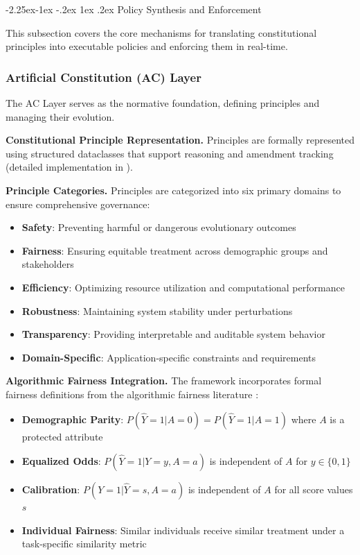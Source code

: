 \documentclass[manuscript,screen,review,anonymous,9pt]{acmart}
\makeatletter
\renewcommand\subsection{\@startsection{subsection}{2}{\z@}%
  {-2.25ex\@plus -1ex \@minus -.2ex}%
  {1ex \@plus .2ex}%
  {\normalfont\large\bfseries}}
\makeatother
\begin{document}
\subsection{Policy Synthesis and Enforcement}
\label{subsec:policy_synthesis_enforcement}

This subsection covers the core mechanisms for translating constitutional principles into executable policies and enforcing them in real-time.

\subsubsection{Artificial Constitution (AC) Layer}
The AC Layer serves as the normative foundation, defining principles and managing their evolution.

\textbf{Constitutional Principle Representation.} Principles are formally represented using structured dataclasses that support reasoning and amendment tracking (detailed implementation in ).

\textbf{Principle Categories.} Principles are categorized into six primary domains to ensure comprehensive governance:

\begin{itemize}
    \item \textbf{Safety}: Preventing harmful or dangerous evolutionary outcomes
    \item \textbf{Fairness}: Ensuring equitable treatment across demographic groups and stakeholders
    \item \textbf{Efficiency}: Optimizing resource utilization and computational performance
    \item \textbf{Robustness}: Maintaining system stability under perturbations
    \item \textbf{Transparency}: Providing interpretable and auditable system behavior
    \item \textbf{Domain-Specific}: Application-specific constraints and requirements
\end{itemize}

\textbf{Algorithmic Fairness Integration.} The framework incorporates formal fairness definitions from the algorithmic fairness literature \cite{Barocas2023FairnessML, Hardt2016EqualityOpportunity, Chouldechova2017FairPrediction}:

\begin{itemize}
    \item \textbf{Demographic Parity}: $P(\hat{Y} = 1 | A = 0) = P(\hat{Y} = 1 | A = 1)$ where $A$ is a protected attribute
    \item \textbf{Equalized Odds}: $P(\hat{Y} = 1 | Y = y, A = a)$ is independent of $A$ for $y \in \{0,1\}$
    \item \textbf{Calibration}: $P(Y = 1 | \hat{Y} = s, A = a)$ is independent of $A$ for all score values $s$
    \item \textbf{Individual Fairness}: Similar individuals receive similar treatment under a task-specific similarity metric
\end{itemize}
\end{document}
